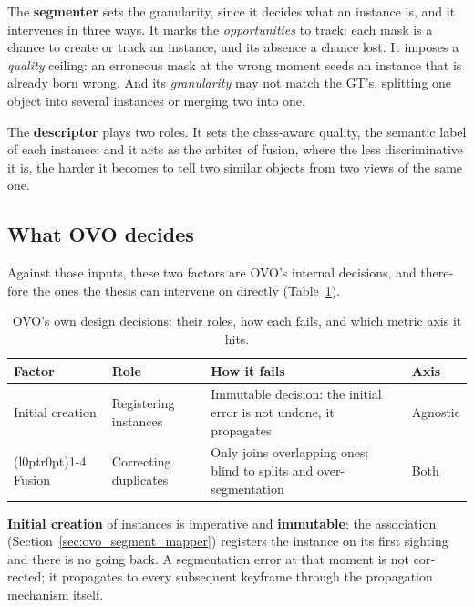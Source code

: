 \begin{otherlanguage}{english}
The \textbf{segmenter} sets the granularity, since it decides what an instance is, and it intervenes
in three ways. It marks the \emph{opportunities} to track: each mask is a chance to create or track
an instance, and its absence a chance lost. It imposes a \emph{quality} ceiling: an erroneous mask at
the wrong moment seeds an instance that is already born wrong. And its \emph{granularity} may not
match the GT's, splitting one object into several instances or merging two into one.

The \textbf{descriptor} plays two roles. It sets the class-aware quality, the semantic label of each
instance; and it acts as the arbiter of fusion, where the less discriminative it is, the harder it
becomes to tell two similar objects from two views of the same one.

\subsection{What OVO decides}
\label{sec:ovo_internal}
\label{sec:fm_scope_limit}%

Against those inputs, these two factors are OVO's internal decisions, and therefore the ones the
thesis can intervene on directly (Table~\ref{tab:factors_internal}).

\begin{table}[h!]
  \centering
  \small
  \setlength{\tabcolsep}{8pt}
  \renewcommand{\arraystretch}{1.15}
  \begin{tabular}{@{}l >{\raggedright\arraybackslash}p{3.5cm} >{\raggedright\arraybackslash}p{5.9cm} l@{}}
    \toprule
    \textbf{Factor} & \textbf{Role} & \textbf{How it fails} & \textbf{Axis} \\
    \midrule
    Initial creation & Registering instances & Immutable decision: the initial error is not undone, it propagates & Agnostic \\
    \cmidrule(l{0pt}r{0pt}){1-4}
    Fusion & Correcting duplicates & Only joins overlapping ones; blind to splits and over-segmentation & Both \\
    \bottomrule
  \end{tabular}
  \caption{OVO's own design decisions: their roles, how each fails, and which metric axis it hits.}
  \label{tab:factors_internal}
\end{table}

\textbf{Initial creation} of instances is imperative and \textbf{immutable}: the association
(Section~\ref{sec:ovo_segment_mapper}) registers the instance on its first sighting and there is no
going back. A segmentation error at that moment is not corrected; it propagates to every subsequent
keyframe through the propagation mechanism itself.


\end{otherlanguage}
